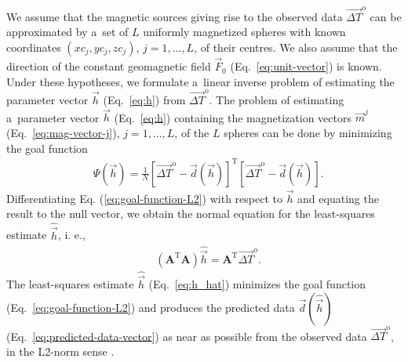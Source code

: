 \documentclass[journal abbreviation, npg]{copernicus}
\begin{document}
We assume that the magnetic sources giving rise to the observed data
$\vec{\Delta T}^\mathrm{o}$ can be approximated by a~set of $L$ uniformly
magnetized spheres with known coordinates $(xc_{j}, yc_{j}, zc_{j})$, $j = 1,
\ldots, L$, of their centres. We also assume that the direction of the
constant geomagnetic field $\vec{F}_{0}$ (Eq.~\ref{eq:unit-vector}) is known.
Under these hypotheses, we formulate a~linear inverse problem of estimating
the parameter vector $\vec{h}$ (Eq.~\ref{eq:h}) from $\vec{\Delta
T}^\mathrm{o}$. The problem of estimating a~parameter vector $\vec{h}$
(Eq.~\ref{eq:h}) containing the magnetization vectors $\vec{m}^{j}$
(Eq.~\ref{eq:mag-vector-j}), $j = 1, \ldots, L$, of the $L$ spheres can be
done by minimizing the goal function
\begin{align}
 &
\Psi(\vec{h}) = \frac{1}{N}[\vec{\Delta T}^\mathrm{o} - \vec{d}(\vec{h})]^{\mathrm{T}}[\vec{\Delta T}^\mathrm{o} - \vec{d}(\vec{h})] .
\label{eq:goal-function-L2}
\end{align}
Differentiating Eq. (\ref{eq:goal-function-L2}) with respect to
$\vec{h}$ and equating the result to the null vector, we obtain the
normal equation for the least-squares estimate $\hat{\vec{h}}$, i. e.,
\begin{align}
 &
(\mathbf{A}^{\mathrm{T}}\mathbf{A})  \hat{\vec{h}} = \mathbf{A}^{\mathrm{T}}  \vec{\Delta T}^\mathrm{o} .
\label{eq:h_hat}
\end{align}
The least-squares estimate $\hat{\vec{h}}$ (Eq.~\ref{eq:h_hat}) minimizes the
goal function (Eq.~\ref{eq:goal-function-L2}) and produces the predicted data
$\vec{d}(\hat{\vec{h}})$ (Eq.~\ref{eq:predicted-data-vector}) as near as
possible from the observed data $\vec{\Delta T}^\mathrm{o}$, in the L2-norm
sense \citep{bard1973,twomey1977,menke1989,aster-etal2005}.
\end{document}
